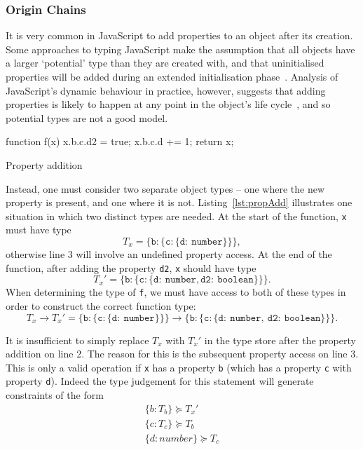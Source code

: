 \documentclass[12pt,a4paper,twoside,openright]{report}
\theoremstyle{definition}
\theoremstyle{dotless}
\newcommand*{\js}{\texttt}
\begin{document}
\subsubsection*{Origin Chains}

It is very common in JavaScript to add properties to an object
after its creation. Some approaches to typing JavaScript make the assumption
that all objects have a larger `potential' type than they are created with, and
that uninitialised properties will be added during an extended initialisation
phase~\cite{anderson05}. Analysis of JavaScript's dynamic behaviour in
practice, however, suggests that adding properties is likely to happen at any
point in the object's life cycle~\cite{JSBehaviour}, and so potential types are
not a good model.

\begin{listing}[t]
  \centering
  \begin{minipage}[b]{0.45\linewidth}
 	\begin{jscript}
	  function f(x) {
	 	x.b.c.d2 = true;
	 	x.b.c.d += 1;
	 	return x;
	  }	
 	\end{jscript}
 	\vspace{23mm}
  \end{minipage}
  \quad
  \begin{minipage}[b]{0.45\linewidth}
  \end{minipage}
  \caption{Property addition}\label{lst:propAdd}
\end{listing}
Instead, one must consider two separate object types -- one where the new
property is present, and one where it is not. Listing~\ref{lst:propAdd}
illustrates one situation in which two distinct types are needed. At the start
of the function, \js{x} must have type 
$$T_x = \mathtt{\{b:\{c:\{d:\ number\}\}\}},$$
otherwise line 3 will involve an undefined property access. At the end of the
function, after adding the property \js{d2}, \js{x} should have type 
$$T_x' = \mathtt{\{b:\{c:\{d:\ number, d2:\ boolean\}\}\}}.$$
When determining the type
of \js{f}, we must have access to both of these types in order to construct the
correct function type: 
$$
T_x \rightarrow T_x' =
\mathtt{\{b:\{c:\{d:\ number\}\}\} \rightarrow
  \{b:\{c:\{d:\ number,\ d2:\ boolean\}\}\}}.
$$

It is insufficient to simply replace $T_x$
with $T_x'$ in the type store after the property addition on line 2.  The reason for this
is the subsequent property access on line 3. This is only a valid operation if \js{x} has
a property \js{b} (which has a property \js{c} with property \js{d}). Indeed the
type judgement for this statement will generate constraints of the form 
\begin{equation}
  \begin{split}
 	\label{eq:barC}
 	\{b:T_b\} \succeq T_x' \\
 	\{c:T_c\} \succeq T_b \\
 	\{d:number\} \succeq T_c \\
  \end{split}
\end{equation}
\end{document}
